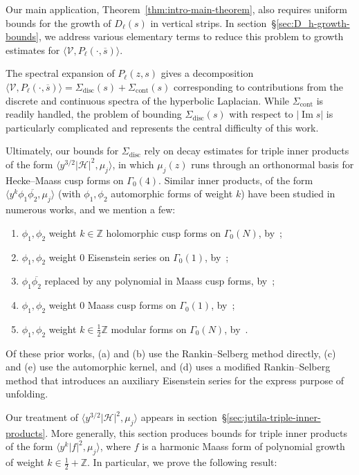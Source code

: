 \documentclass[11pt,reqno]{amsart}
\theoremstyle{plain}
\theoremstyle{definition}
\numberwithin{equation}{section}
\renewcommand{\Im}{\operatorname{Im}}
\begin{document}
Our main application, Theorem~\ref{thm:intro-main-theorem}, also requires uniform bounds for the growth of $D_\ell(s)$ in vertical strips. In section~\S{\ref{sec:D_h-growth-bounds}}, we address various elementary terms to reduce this problem to growth estimates for $\langle \mathcal{V}, P_\ell(\cdot, \overline{s}) \rangle$.

The spectral expansion of $P_\ell(z,s)$ gives a decomposition $\langle \mathcal{V}, P_\ell(\cdot, \overline{s}) \rangle = \Sigma_{\mathrm{disc}}(s) + \Sigma_{\mathrm{cont}}(s)$ corresponding to contributions from the discrete and continuous spectra of the hyperbolic Laplacian. While $\Sigma_{\mathrm{cont}}$ is readily handled, the problem of bounding $\Sigma_{\mathrm{disc}}(s)$ with respect to $\vert \Im s \vert$ is particularly complicated and represents the central difficulty of this work.

Ultimately, our bounds for $\Sigma_{\mathrm{disc}}$ rely on decay estimates for triple inner products of the form $\langle y^{3/2} \vert \mathcal{H} \vert^2, \mu_j \rangle$, in which $\mu_j(z)$ runs through an orthonormal basis for Hecke--Maass cusp forms on $\Gamma_0(4)$. Similar inner products, of the form $\langle y^k \phi_1 \overline{\phi_2}, \mu_j  \rangle$ (with $\phi_1,\phi_2$ automorphic forms of weight $k$) have been studied in numerous works, and we mention a few:
\begin{enumerate}
	\item[a.] $\phi_1, \phi_2$ weight $k \in \mathbb{Z}$ holomorphic cusp forms on $\Gamma_0(N)$, by~\cite{Good81};
	\item[b.] $\phi_1, \phi_2$ weight $0$ Eisenstein series on $\Gamma_0(1)$, by~\cite{VinogradovTakhtadzhyan87};
	\item[c.] $\phi_1\overline{\phi_2}$ replaced by any polynomial in Maass cusp forms, by~\cite{Sarnak94};
	\item[d.] $\phi_1, \phi_2$ weight $0$ Maass cusp forms on $\Gamma_0(1)$, by~\cite{Jutila96,Jutila97};
	\item[e.] $\phi_1,\phi_2$ weight $k \in \frac{1}{2} \mathbb{Z}$ modular forms on $\Gamma_0(N)$, by~\cite{Kiral15}.
\end{enumerate}
Of these prior works, (a) and (b) use the Rankin--Selberg method directly, (c) and (e) use the automorphic kernel, and (d) uses a modified Rankin--Selberg method that introduces an auxiliary Eisenstein series for the express purpose of unfolding.

Our treatment of $\langle y^{3/2} \vert \mathcal{H} \vert^2, \mu_j \rangle$ appears in section~\S{\ref{sec:jutila-triple-inner-products}}. More generally, this section produces bounds for triple inner products of the form $\langle y^{k} \vert f \vert^2, \mu_j \rangle$, where $f$ is a harmonic Maass form of polynomial growth of weight $k \in \frac{1}{2} + \mathbb{Z}$.
In particular, we prove the following result:
\end{document}
